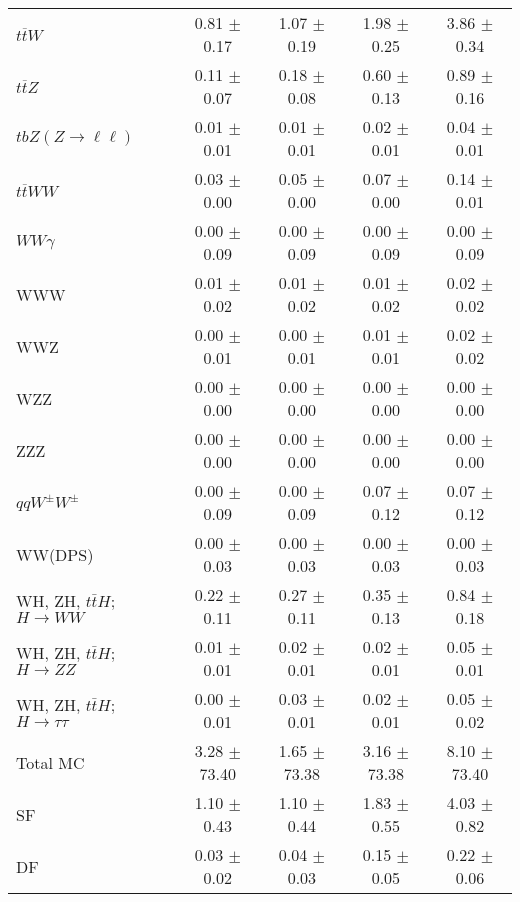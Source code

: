 \begin{tabular}{l|cccc}
                   $t\overline{t}W$ &  0.81 $\pm$  0.17 &  1.07 $\pm$  0.19 &  1.98 $\pm$  0.25 &  3.86 $\pm$  0.34 \\
                   $t\overline{t}Z$ &  0.11 $\pm$  0.07 &  0.18 $\pm$  0.08 &  0.60 $\pm$  0.13 &  0.89 $\pm$  0.16 \\
    $tbZ (Z \rightarrow \ell \ell)$ &  0.01 $\pm$  0.01 &  0.01 $\pm$  0.01 &  0.02 $\pm$  0.01 &  0.04 $\pm$  0.01 \\
                  $t\overline{t}WW$ &  0.03 $\pm$  0.00 &  0.05 $\pm$  0.00 &  0.07 $\pm$  0.00 &  0.14 $\pm$  0.01 \\
                         $WW\gamma$ &  0.00 $\pm$  0.09 &  0.00 $\pm$  0.09 &  0.00 $\pm$  0.09 &  0.00 $\pm$  0.09 \\
                                WWW &  0.01 $\pm$  0.02 &  0.01 $\pm$  0.02 &  0.01 $\pm$  0.02 &  0.02 $\pm$  0.02 \\
                                WWZ &  0.00 $\pm$  0.01 &  0.00 $\pm$  0.01 &  0.01 $\pm$  0.01 &  0.02 $\pm$  0.02 \\
                                WZZ &  0.00 $\pm$  0.00 &  0.00 $\pm$  0.00 &  0.00 $\pm$  0.00 &  0.00 $\pm$  0.00 \\
                                ZZZ &  0.00 $\pm$  0.00 &  0.00 $\pm$  0.00 &  0.00 $\pm$  0.00 &  0.00 $\pm$  0.00 \\
                 $qqW^{\pm}W^{\pm}$ &  0.00 $\pm$  0.09 &  0.00 $\pm$  0.09 &  0.07 $\pm$  0.12 &  0.07 $\pm$  0.12 \\
                            WW(DPS) &  0.00 $\pm$  0.03 &  0.00 $\pm$  0.03 &  0.00 $\pm$  0.03 &  0.00 $\pm$  0.03 \\
WH, ZH, $t\bar{t}H$; $H \rightarrow WW$ &  0.22 $\pm$  0.11 &  0.27 $\pm$  0.11 &  0.35 $\pm$  0.13 &  0.84 $\pm$  0.18 \\
WH, ZH, $t\bar{t}H$; $H \rightarrow ZZ$ &  0.01 $\pm$  0.01 &  0.02 $\pm$  0.01 &  0.02 $\pm$  0.01 &  0.05 $\pm$  0.01 \\
WH, ZH, $t\bar{t}H$; $H \rightarrow \tau\tau$ &  0.00 $\pm$  0.01 &  0.03 $\pm$  0.01 &  0.02 $\pm$  0.01 &  0.05 $\pm$  0.02 \\
\hline\hline
                           Total MC &  3.28 $\pm$ 73.40 &  1.65 $\pm$ 73.38 &  3.16 $\pm$ 73.38 &  8.10 $\pm$ 73.40 \\
\hline
                                 SF &  1.10 $\pm$  0.43 &  1.10 $\pm$  0.44 &  1.83 $\pm$  0.55 &  4.03 $\pm$  0.82 \\
                                 DF &  0.03 $\pm$  0.02 &  0.04 $\pm$  0.03 &  0.15 $\pm$  0.05 &  0.22 $\pm$  0.06 \\

\end{tabular}
